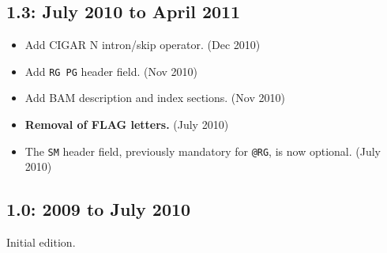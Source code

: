 \documentclass[10pt]{article}
\begin{document}
\begin{appendices}
\subsection*{1.3: July 2010 to April 2011}

\begin{itemize}
\item Add CIGAR N intron/skip operator. (Dec 2010)
\item Add {\tt RG PG} header field. (Nov 2010)
\item Add BAM description and index sections. (Nov 2010)
\item \textbf{Removal of FLAG letters.} (July 2010)
\item The {\tt SM} header field, previously mandatory for {\tt @RG}, is now
optional. (July 2010)
\end{itemize}

\subsection*{1.0: 2009 to July 2010}

Initial edition.

\end{appendices}
\end{document}
